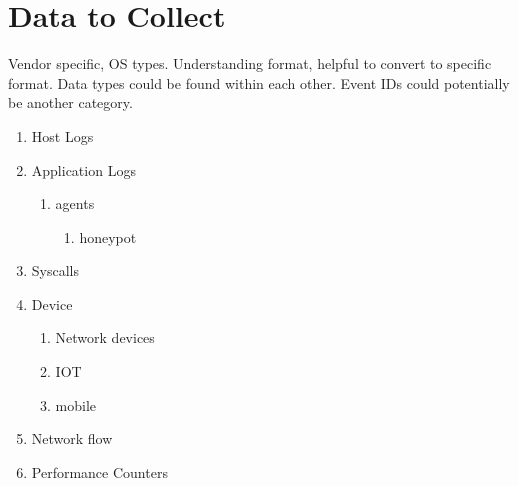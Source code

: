 \documentclass[conference]{IEEEtran}
\begin{document}
\section{Data to Collect}
Vendor specific, OS types. Understanding format, helpful to convert to specific format. Data types could be found within each other. Event IDs could potentially be another category.
\begin{enumerate}
    \item Host Logs\cite{jia2017big}\cite{marchetti2016analysis}
    \item Application Logs\cite{giura2012context}\cite{ten2010cybersecurity}
        \begin{enumerate}
            \item agents\cite{garcia2009anomaly}
            \begin{enumerate}
                \item honeypot\cite{jasek2013apt}
            \end{enumerate}
        \end{enumerate}
    \item Syscalls\cite{warrender1999detecting}\cite{hofmeyr1998intrusion}
    \item Device\cite{horne2002management}
    \begin{enumerate}
        \item Network devices
        \item IOT
        \item mobile
    \end{enumerate}
    \item Network flow \cite{kim2013detection}
    \item Performance Counters
\end{enumerate}
\end{document}

